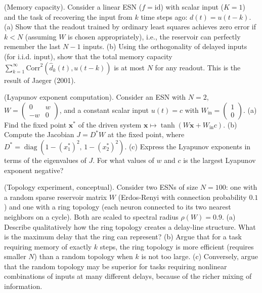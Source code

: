 \begin{exercise}
(Memory capacity). Consider a linear ESN ($f = \text{id}$) with scalar input ($K = 1$) and the task of recovering the input from $k$ time steps ago: $d(t) = u(t-k)$.
   (a) Show that the readout trained by ordinary least squares achieves zero error if $k < N$ (assuming $W$ is chosen appropriately), i.e., the reservoir can perfectly remember the last $N-1$ inputs.
   (b) Using the orthogonality of delayed inputs (for i.i.d. input), show that the total memory capacity $\sum_{k=1}^{\infty} \text{Corr}^2(\hat{d}_k(t), u(t-k))$ is at most $N$ for any readout. This is the result of Jaeger (2001).
\end{exercise}


\begin{exercise}
(Lyapunov exponent computation). Consider an ESN with $N = 2$, $W = \begin{pmatrix} 0 & w \\ -w & 0 \end{pmatrix}$, and a constant scalar input $u(t) = c$ with $W_{\text{in}} = \begin{pmatrix} 1 \\ 0 \end{pmatrix}$.
   (a) Find the fixed point $\mathbf{x}^*$ of the driven system $\mathbf{x} \mapsto \tanh(W\mathbf{x} + W_{\text{in}} c)$.
   (b) Compute the Jacobian $J = D^* W$ at the fixed point, where $D^* = \operatorname{diag}(1 - (x_1^*)^2,\, 1 - (x_2^*)^2)$.
   (c) Express the Lyapunov exponents in terms of the eigenvalues of $J$. For what values of $w$ and $c$ is the largest Lyapunov exponent negative?
\end{exercise}


\begin{exercise}
(Topology experiment, conceptual). Consider two ESNs of size $N = 100$: one with a random sparse reservoir matrix $W$ (Erdos-Renyi with connection probability $0.1$) and one with a ring topology (each neuron connected to its two nearest neighbors on a cycle). Both are scaled to spectral radius $\rho(W) = 0.9$.
   (a) Describe qualitatively how the ring topology creates a delay-line structure. What is the maximum delay that the ring can represent?
   (b) Argue that for a task requiring memory of exactly $k$ steps, the ring topology is more efficient (requires smaller $N$) than a random topology when $k$ is not too large.
   (c) Conversely, argue that the random topology may be superior for tasks requiring nonlinear combinations of inputs at many different delays, because of the richer mixing of information.


\bigskip

\end{exercise}


